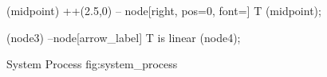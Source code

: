 {                    %
                     (midpoint) ++(2.5,0) 
                        -- node[right, pos=0, font=\normalsize] {T} (midpoint);
                        
                     (node3) --node[arrow_label] {T is linear} (node4);
                    
                }
                {System Process}
                {fig:system_process}

